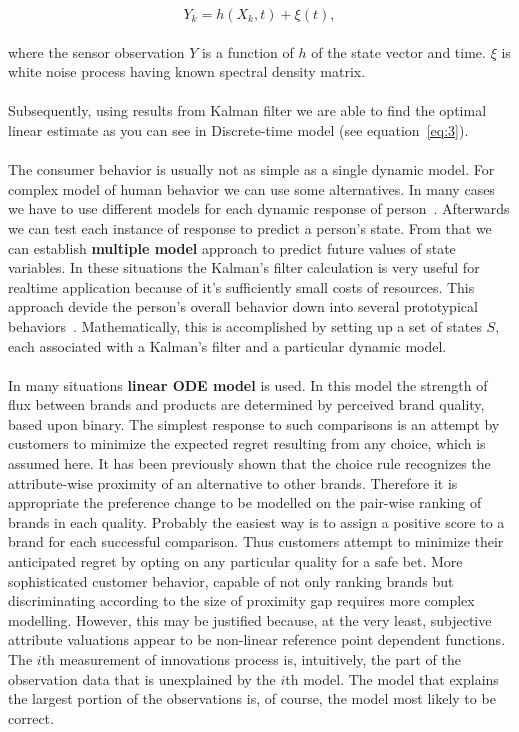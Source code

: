 \begin{equation} \label{eq:2}
Y_k = h(X_k, t) + \xi(t),
\end{equation}
\\
where the sensor observation $Y$ is a function of $h$ of the state vector and time. $\xi$ is white noise process having known spectral density matrix.\\
\\
Subsequently, using results from Kalman filter we are able to find the optimal linear estimate as you can see in Discrete-time model (see equation~\ref{eq:3}).\\
\\
The consumer behavior is usually not as simple as a single dynamic model.
For complex model of human behavior we can use some alternatives.
In many cases we have to use different models for each dynamic response of person~\cite{wilsky}.
Afterwards we can test each instance of response to predict a person's state.
From that we can establish \textbf{multiple model} approach to predict future values of state variables.
In these situations the Kalman’s filter calculation is very useful for realtime application because of it’s sufficiently small costs of resources.
This approach devide the person’s overall behavior down into several prototypical behaviors~\cite{pantland}.
Mathematically, this is accomplished by setting up a set of states $S$, each associated with a Kalman’s filter and a particular dynamic model.\\
\\
In many situations \textbf{linear ODE model} is used.
In this model the strength of flux between brands and products are determined by perceived brand quality, based upon binary.
The simplest response to such comparisons is an attempt by customers to minimize the expected regret resulting from any choice, which is assumed here.
It has been previously shown that the choice rule recognizes the attribute-wise proximity of an alternative to other brands.
Therefore it is appropriate the preference change to be modelled on the pair-wise ranking of brands in each quality.
Probably the easiest way is to assign a positive score to a brand for each successful comparison.
Thus customers attempt to minimize their anticipated regret by opting on any particular quality for a safe bet.
More sophisticated customer behavior, capable of not only ranking brands but discriminating according to the size of proximity gap requires more complex modelling.
However, this may be justified because, at the very least, subjective attribute valuations appear to be non-linear reference point dependent functions.
The $i$th measurement of innovations process is, intuitively, the part of the observation data that is unexplained by the $i$th model.
The model that explains the largest portion of the observations is, of course, the model most likely to be correct.
\\

